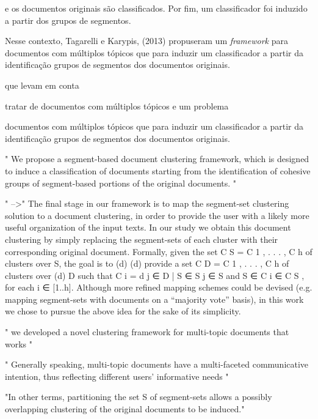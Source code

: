 

e os documentos originais são classificados. Por fim, um classificador foi induzido a partir dos grupos de segmentos.



Nesse contexto, Tagarelli e Karypis, (2013) propuseram um \textit{framework} para documentos com múltiplos tópicos que para induzir um classificador a partir da identificação grupos de segmentos dos documentos originais.


que levam em conta 




tratar de documentos com múltiplos tópicos e um problema 

documentos com múltiplos tópicos que para induzir um classificador a partir da identificação grupos de segmentos dos documentos originais.



\cite{Tagarelli2013} 
" We propose a segment-based document clustering framework, which is designed to induce a classification of documents starting from the identification of cohesive groups of segment-based portions of the original documents. "


" -->"
The final stage in our framework is to map the segment-set clustering solution to a document clustering, in order to provide the user with a likely more useful organization of the input texts. In our study we obtain this document clustering by simply replacing the segment-sets of each cluster with their corresponding original document. Formally, given the set C S = {C 1 , . . . , C h } of clusters over S, the goal is to (d) (d) provide a set C D = {C 1 , . . . , C h } of clusters over (d) D such that C i = {d j ∈ D | S ∈ S j ∈ S and S ∈ C i ∈ C S }, for each i ∈ [1..h].  Although more refined mapping schemes could be devised (e.g. mapping segment-sets with documents on a “majority vote” basis), in this work we chose to pursue the above idea for the sake of its simplicity.



" we developed a novel clustering framework for multi-topic documents that works "

" Generally speaking, multi-topic documents have a multi-faceted communicative intention, thus reflecting different users’ informative needs "


"In other terms, partitioning the set S of segment-sets allows a possibly overlapping clustering of the original documents to be induced."



